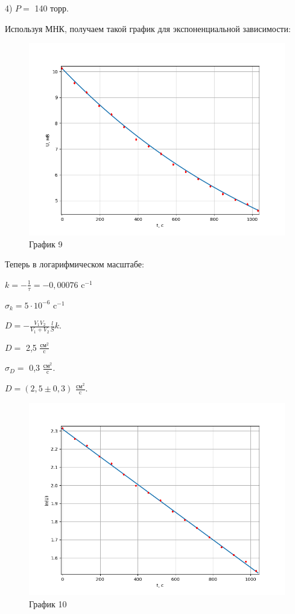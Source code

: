 \documentclass[a4paper,12pt]{article} %
\begin{document}
\begin{enumerate}
\newpage

4) $P = $ 140 торр.

Используя МНК, получаем такой график для экспоненциальной зависимости:
\begin{figure}[h!]
	\centering
	\includegraphics[scale=0.8]{Pictures/График4(эксп).png}
	\caption*{График 9}
\end{figure}

Теперь в логарифмическом масштабе:

$k = -\frac{1}{\tau} = -0,00076$ c$^{-1}$

$\sigma_{k} = 5\cdot 10^{-6}$ c$^{-1}$

$D = - \frac{V_{1}V_{2}}{V_{1} + V_{2}}\frac{l}{S}k$.

$D = $ 2,5 $\frac{\text{см}^2}{\text{c}}$

$\sigma_{D} = $ 0,3 $\frac{\text{см}^2}{\text{c}}$.
\vspace{15mm}

$D = (2,5 \pm 0,3)$ $\frac{\text{см}^2}{\text{c}}$.
\newpage
\begin{figure}[h!]
	\centering
	\includegraphics[scale=0.8]{Pictures/График4(лин).png}
	\caption*{График 10}
\end{figure}


\end{enumerate}
\end{document}

